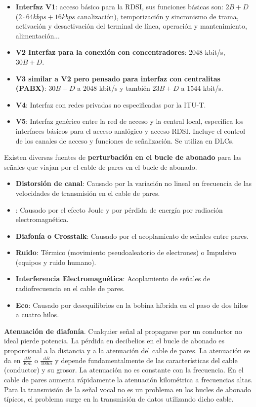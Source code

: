 \documentclass[10pt,portrait, twocolumn]{article}
\begin{document}
	\begin{itemize}
		\item \textbf{Interfaz V1}: acceso básico para la RDSI, sus funciones básicas son: $2B + D$ ($2 \cdot 64 kbps + 16 kbps$ canalización), temporización y sincronismo de trama, activación y desactivación del terminal de línea, operación y mantenimiento, alimentación... 
		\item \textbf{V2 Interfaz para la conexión con concentradores}: 2048 kbit/s, $30B + D$.
		\item  \textbf{V3 similar a V2 pero pensado para interfaz con centralitas (PABX)}: $30B + D$ a 2048 kbit/s y también $23B+D$ a 1544 kbit/s.
		\item  \textbf{V4}: Interfaz con redes privadas no especificadas por la ITU-T.
		\item  \textbf{V5}: Interfaz genérico entre la red de acceso y la central local, especifica los interfaces básicos para el acceso analógico y acceso RDSI. Incluye el control de los canales de acceso y funciones de señalización. Se utiliza en DLCs.
	\end{itemize}

Existen diversas fuentes de \textbf{perturbación en el bucle de abonado} para las señales que viajan por el cable de pares en el bucle de abonado.

	\begin{itemize}
		\item \textbf{Distorsión de canal}: Causado por la variación no lineal en frecuencia de las velocidades de transmisión en el cable de pares.
		\item {}: Causado por el efecto Joule y por pérdida de energía por radiación electromagnética.
		\item \textbf{Diafonía o Crosstalk}: Causado por el acoplamiento de señales entre pares.
		\item \textbf{Ruido}: Térmico (movimiento pseudoaleatorio de electrones) o Impulsivo (equipos y ruido humano).
		\item \textbf{Interferencia Electromagnética}: Acoplamiento de señales de radiofrecuencia en el cable de pares.
		\item \textbf{Eco}: Causado por desequilibrios en la bobina híbrida en el paso de dos hilos a cuatro hilos.
	\end{itemize}

\textbf{Atenuación de diafonía}. Cualquier señal al propagarse por un conductor no ideal pierde potencia. La pérdida en decibelios en el bucle de abonado es proporcional a la distancia y a la atenuación del cable de pares. La atenuación se da en $\frac{dB}{Km}$ o $\frac{dB}{100 m}$ y depende fundamentalmente de las características del cable (conductor) y su grosor. La atenuación no es constante con la frecuencia. En el cable de pares aumenta rápidamente la atenuación kilométrica a frecuencias altas. Para la transmisión de la señal vocal no es un problema en los bucles de abonado típicos, el problema surge en la transmisión de datos utilizando dicho cable.
\end{document}

